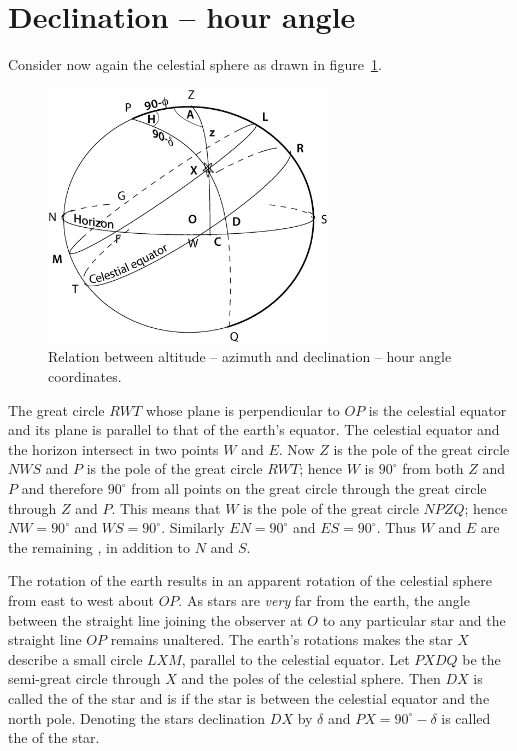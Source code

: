 \section{Declination -- hour angle}

Consider now again the celestial sphere as drawn in figure~\ref{fig:hr-dec}.

\begin{figure}[h]
\centering
\includegraphics[width=0.66\textwidth]{hr-dec.eps}
\caption{Relation between altitude -- azimuth and declination -- hour angle
coordinates.}
\label{fig:hr-dec}
\end{figure}

The great circle $RWT$ whose plane is perpendicular to $OP$ is the
celestial equator and its plane is parallel to that of the
earth's equator. The celestial equator and the horizon intersect in
two points $W$ and $E$. Now $Z$ is the pole of the great circle $NWS$
and $P$ is the pole of the great circle $RWT$; hence $W$ is $90^\circ$
from both $Z$ and $P$ and therefore $90^\circ$ from all points on the
great circle through the great circle through $Z$ and $P$. This means
that $W$ is the pole of the great circle $NPZQ$; hence $NW=90^\circ$
and $WS=90^\circ$. Similarly  $EN=90^\circ$ and  $ES=90^\circ$. Thus
$W$ and $E$ are the remaining {}, in addition to
$N$ and $S$. 

The rotation of the earth results in an apparent rotation of the
celestial sphere from east to west about $OP$. As stars are {\it very}
far from the earth, the angle between the straight line joining the
observer at $O$ to any particular star and the straight line $OP$
remains unaltered. The earth's rotations makes the star $X$ describe a
small circle $LXM$, parallel to the celestial equator. Let $PXDQ$ be
the semi-great circle through $X$ and the poles of the celestial
sphere. Then $DX$ is called the {} of the star and is
{} if the star is between the celestial equator and
the north pole. Denoting the stars declination $DX$ by $\delta$ and
$PX=90^\circ-\delta$ is called the {} of the
star. 

